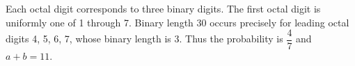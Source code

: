 Each octal digit corresponds to three binary digits. The first octal digit is uniformly one of 1 through 7. Binary length 30 occurs precisely for leading octal digits 4, 5, 6, 7, whose binary length is 3. Thus the probability is $\dfrac{4}{7}$ and $\boxed{a+b=11}$.
